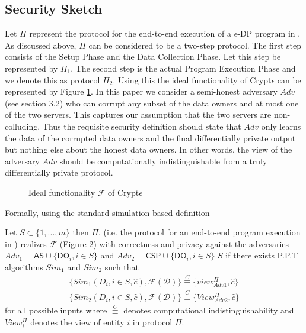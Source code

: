 \subsection{\system Security Sketch}
 Let $\Pi$ represent the protocol for the end-to-end execution of a $\epsilon$-DP program in \system. As discussed above, $\Pi$ can be considered to be a two-step protocol. The first step consists of the Setup Phase and the Data Collection Phase. Let this step be represented by $\Pi_1$. The second step is the actual Program Execution Phase and we denote this as protocol $\Pi_2$. Using this the ideal functionality of Crypt$\epsilon$ can be represented by Figure \ref{ideal}.  In this paper we consider a
semi-honest adversary  $Adv$ (see section 3.2) who can corrupt any subset of the data owners and at most one of the two
servers. This captures our assumption that the two servers are non-colluding. Thus the requisite security definition should state that $Adv$ only learns the data of the corrupted data owners and the final differentially private output but nothing else about the honest data owners. In other words, the view of the adversary $Adv$ should be computationally indistinguishable from a truly differentially private protocol.
 \begin{figure}\noindent{}  \caption{Ideal functionality $\mathcal{F}$ of Crypt$\epsilon$} \label{ideal} \end{figure}
Formally, using the standard simulation based definition \cite{Oded} 
\begin{theorem}  Let $S \subset \{1,...,m\}$ then $\Pi$, (i.e. the protocol for an end-to-end program execution in \system) realizes $\mathcal{F}$ (Figure 2)  with correctness and privacy against
the adversaries $Adv_1=\textsf{AS} \cup \{\textsf{DO}_i, i \in S\}$  and $Adv_2=\textsf{CSP} \cup  \{ \textsf{DO}_i, i \in S\} $
$S$ if there exists  P.P.T algorithms $Sim_1$ and $Sim_2$ such that \begin{gather} \big\{Sim_1({D_i, i \in S},\hat{c}),\mathcal{F}(\mathcal{D})\big\} \stackrel{C}{\equiv} \big\{view^{\Pi}_{Adv1},\hat{c}\big\}
\\\big\{Sim_2({D_i, i \in S},\hat{c}),\mathcal{F}(\mathcal{D})\big\} \stackrel{C}{\equiv}\big\{ View^{\Pi}_{Adv2},\hat{c}\big\}
\end{gather} for all possible inputs  where $ \stackrel{C}{\equiv}$ denotes computational indistinguishability and $View^{\Pi}_i$ denotes the view of entity $i$ in protocol $\Pi$. 
\end{theorem}
